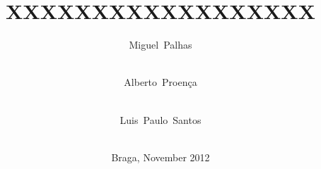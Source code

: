 \titlehead{%
University~of~Minho\hfill Informatics~Department%
}

\subject{Dissertation for Master’s Degree in Informatics Engineering}

\author{%
Miguel~Palhas\\\student\\%
\and Alberto~Proença\\\advisor\\%
\and Luis~Paulo~Santos\\\coadvisor\\%
}

\title{XXXXXXXXXXXXXXXXXX}

\date{Braga, November 2012}
